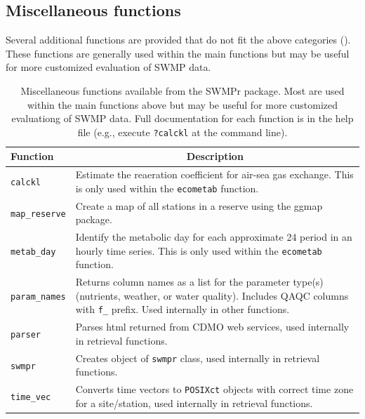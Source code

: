 \documentclass[10pt,letterpaper]{article}\usepackage[]{graphicx}\usepackage[]{color}
\begin{document}
\subsection*{Miscellaneous functions}

Several additional functions are provided that do not fit the above categories ().  These functions are generally used within the main functions but may be useful for more customized evaluation of \ac{SWMP} data.  

\begin{table}[!tbp]
\caption{Miscellaneous functions available from the SWMPr package.  Most are used within the main functions above but may be useful for more customized evaluationg of \ac{SWMP} data.  Full documentation for each function is in the help file (e.g., execute \texttt{?calckl} at the command line).\label{tab:misc}} 
\begin{center}
\begin{tabular}{lp{3.5in}}
\hline\hline
\multicolumn{1}{l}{Function}&\multicolumn{1}{c}{Description}\tabularnewline
\hline
\texttt{calckl}&Estimate the reaeration coefficient for air-sea gas exchange.  This is only used within the \texttt{ecometab} function.\tabularnewline
\texttt{map\_reserve}&Create a map of all stations in a reserve using the ggmap package.\tabularnewline
\texttt{metab\_day}&Identify the metabolic day for each approximate 24 period in an hourly time series.  This is only used within the \texttt{ecometab} function.\tabularnewline
\texttt{param\_names}&Returns column names as a list for the parameter type(s) (nutrients, weather, or water quality).  Includes \ac{QAQC} columns with \texttt{f\_} prefix. Used internally in other functions.\tabularnewline
\texttt{parser}&Parses html returned from \ac{CDMO} web services, used internally in retrieval functions.\tabularnewline
\texttt{swmpr}&Creates object of \texttt{swmpr} class, used internally in retrieval functions.\tabularnewline
\texttt{time\_vec}&Converts time vectors to \texttt{POSIXct} objects with correct time zone for a site/station, used internally in retrieval functions.\tabularnewline
\hline
\end{tabular}\end{center}

\end{table}
\end{document}
